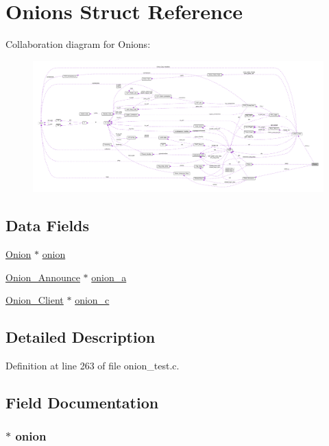 \hypertarget{struct_onions}{\section{Onions Struct Reference}
\label{struct_onions}
}


Collaboration diagram for Onions\+:
\nopagebreak
\begin{figure}[H]
\begin{center}
\leavevmode
\includegraphics[width=350pt]{da/d03/struct_onions__coll__graph}
\end{center}
\end{figure}
\subsection*{Data Fields}
\begin{DoxyCompactItemize}
\item 
\hyperlink{struct_onion}{Onion} $\ast$ \hyperlink{struct_onions_a66fb4bf67c711a5ed3e7bbecec7fde30}{onion}
\item 
\hyperlink{struct_onion___announce}{Onion\+\_\+\+Announce} $\ast$ \hyperlink{struct_onions_a3a345721fb6be385f4b4519679a4609f}{onion\+\_\+a}
\item 
\hyperlink{struct_onion___client}{Onion\+\_\+\+Client} $\ast$ \hyperlink{struct_onions_ae202b81f9a2c2fa80fd310a0996795fc}{onion\+\_\+c}
\end{DoxyCompactItemize}


\subsection{Detailed Description}


Definition at line 263 of file onion\+\_\+test.\+c.



\subsection{Field Documentation}
\hypertarget{struct_onions_a66fb4bf67c711a5ed3e7bbecec7fde30}{
\subsubsection[{onion}]{$\ast$ onion}}\label{struct_onions_a66fb4bf67c711a5ed3e7bbecec7fde30}


